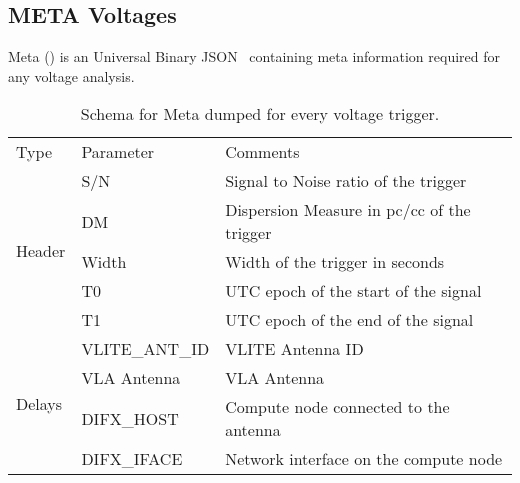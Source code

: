 \subsection {META Voltages}
\label{ssub:metar}
\par Meta (\meta) is an Universal Binary JSON~\cite{ubjson} containing meta information required for any voltage analysis.
\begin{table}[]
	\label{tab:metar}
	\caption{Schema for Meta dumped for every voltage trigger.}
	\begin{tabular}{lll}
		Type                     & Parameter      & Comments                                                                                                               \\
		\multirow{5}{*}{Header}  & S/N            & Signal to Noise ratio of the trigger                                                                                   \\
														 & DM             & Dispersion Measure in pc/cc of the trigger                                                                             \\
														 & Width          & Width of the trigger in seconds                                                                                        \\
														 & T0             & UTC epoch of the start of the signal                                                                                   \\
														 & T1             & UTC epoch of the end of the signal                                                                                     \\
		\multirow{8}{*}{Delays}  & VLITE\_ANT\_ID & VLITE Antenna ID                                                                                                       \\
														 & VLA Antenna    & VLA Antenna                                                                                                            \\
														 & DIFX\_HOST     & Compute node connected to the antenna                                                                                  \\
														 & DIFX\_IFACE    & Network interface on the compute node                                                                                  \\

\end{tabular}
\end{table}

